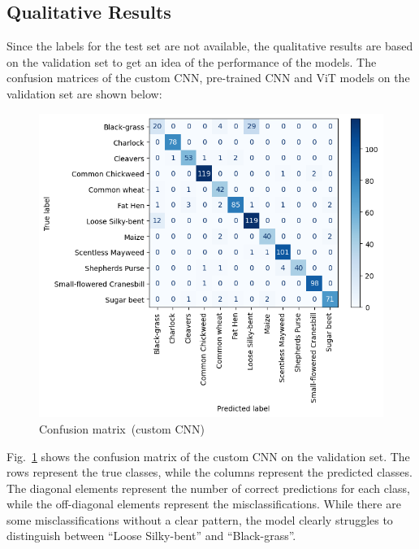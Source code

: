 \subsection{Qualitative Results}

Since the labels for the test set are not available, the qualitative results are based on the validation set to get an idea of the performance of the models. The confusion matrices of the custom CNN, pre-trained CNN and ViT models on the validation set are shown below:

\begin{figure}[htbp]
    \centerline{\includegraphics[width=0.9\linewidth]{../../resources/custom_cnn/confusion.png}}
    \caption{Confusion matrix~(custom CNN)}
    \label{fig:confusion-matrix-custom-cnn}
\end{figure}

Fig.~\ref{fig:confusion-matrix-custom-cnn} shows the confusion matrix of the custom CNN on the validation set. The rows represent the true classes, while the columns represent the predicted classes. The diagonal elements represent the number of correct predictions for each class, while the off-diagonal elements represent the misclassifications. While there are some misclassifications without a clear pattern, the model clearly struggles to distinguish between ``Loose Silky-bent'' and ``Black-grass''.

